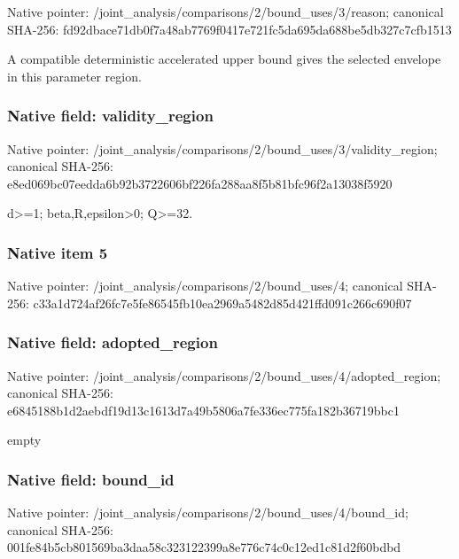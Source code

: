 \documentclass[10pt,a4paper]{article}
\begin{document}
Native pointer: /joint\_analysis/comparis\allowbreak{}ons/2/bound\_uses/3/reaso\allowbreak{}n; canonical SHA-256: fd92dbace71db0f7a48ab776\allowbreak{}9f0417e721fc5da695da688b\allowbreak{}e5db327c7cfb1513


A compatible deterministic accelerated upper bound gives the selected envelope in this parameter region.


\subsubsection{Native field: validity\_region}


Native pointer: /joint\_analysis/comparis\allowbreak{}ons/2/bound\_uses/3/valid\allowbreak{}ity\_region; canonical SHA-256: e8ed069bc07eedda6b92b372\allowbreak{}2606bf226fa288aa8f5b81bf\allowbreak{}c96f2a13038f5920


d>=1; beta,R,epsilon>0; Q>=32.


\subsubsection{Native item 5}


Native pointer: /joint\_analysis/comparis\allowbreak{}ons/2/bound\_uses/4; canonical SHA-256: c33a1d724af26fc7e5fe8654\allowbreak{}5fb10ea2969a5482d85d421f\allowbreak{}fd091c266c690f07



\subsubsection{Native field: adopted\_region}


Native pointer: /joint\_analysis/comparis\allowbreak{}ons/2/bound\_uses/4/adopt\allowbreak{}ed\_region; canonical SHA-256: e6845188b1d2aebdf19d13c1\allowbreak{}613d7a49b5806a7fe336ec77\allowbreak{}5fa182b36719bbc1


empty


\subsubsection{Native field: bound\_id}


Native pointer: /joint\_analysis/comparis\allowbreak{}ons/2/bound\_uses/4/bound\allowbreak{}\_id; canonical SHA-256: 001fe84b5cb801569ba3daa5\allowbreak{}8c323122399a8e776c74c0c1\allowbreak{}2ed1c81d2f60bdbd
\end{document}
